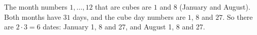 The month numbers $1,\dots,12$ that are cubes are $1$ and $8$ (January and August). Both months have $31$ days, and the cube day numbers are $1$, $8$ and $27$. So there are $2\cdot3=\boxed{6}$ dates: January 1, 8 and 27, and August 1, 8 and 27.
